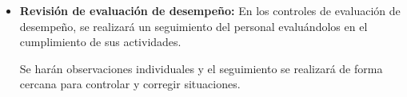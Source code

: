 \documentclass[a4paper,12pt]{article}
\begin{document}
\begin{itemize}



	    \item \textbf{Revisión de evaluación de desempeño:} En los controles de evaluación de desempeño, se realizará un seguimiento del personal evaluándolos en el cumplimiento de sus actividades.
        
        Se harán observaciones individuales y el seguimiento se realizará de forma cercana para controlar y corregir situaciones.
        

    \end{itemize}



\end{document}
